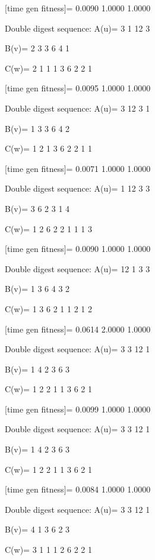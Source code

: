 [time gen fitness]=
    0.0090    1.0000    1.0000

Double digest sequence:
A(u)=
     3     1    12     3

B(v)=
     2     3     3     6     4     1

C(w)=
     2     1     1     1     3     6     2     2     1

[time gen fitness]=
    0.0095    1.0000    1.0000

Double digest sequence:
A(u)=
     3    12     3     1

B(v)=
     1     3     3     6     4     2

C(w)=
     1     2     1     3     6     2     2     1     1

[time gen fitness]=
    0.0071    1.0000    1.0000

Double digest sequence:
A(u)=
     1    12     3     3

B(v)=
     3     6     2     3     1     4

C(w)=
     1     2     6     2     2     1     1     1     3

[time gen fitness]=
    0.0090    1.0000    1.0000

Double digest sequence:
A(u)=
    12     1     3     3

B(v)=
     1     3     6     4     3     2

C(w)=
     1     3     6     2     1     1     2     1     2

[time gen fitness]=
    0.0614    2.0000    1.0000

Double digest sequence:
A(u)=
     3     3    12     1

B(v)=
     1     4     2     3     6     3

C(w)=
     1     2     2     1     1     3     6     2     1

[time gen fitness]=
    0.0099    1.0000    1.0000

Double digest sequence:
A(u)=
     3     3    12     1

B(v)=
     1     4     2     3     6     3

C(w)=
     1     2     2     1     1     3     6     2     1

[time gen fitness]=
    0.0084    1.0000    1.0000

Double digest sequence:
A(u)=
     3     3    12     1

B(v)=
     4     1     3     6     2     3

C(w)=
     3     1     1     1     2     6     2     2     1

